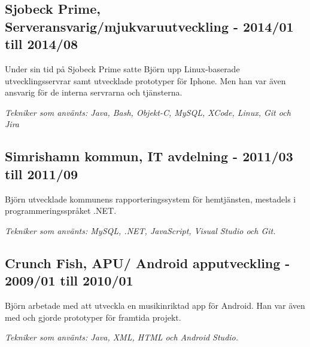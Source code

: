 \documentclass{article}
\begin{document}
\begin{minipage}[t]{0.7\textwidth}
  \vspace{15pt} %
  \subsection*{\textcolor{colorTitelErfarenhet}{Sjobeck Prime, Serveransvarig/mjukvaruutveckling - 2014/01 till 2014/08}}
  Under sin tid på Sjobeck Prime satte Björn upp Linux-baserade utvecklingsservrar samt utvecklade 
  prototyper för Iphone. Men han var även ansvarig för de interna servrarna och tjänsterna.
  
  \vspace{5pt}\textit{Tekniker som använts: Java, Bash, Objekt-C, MySQL, XCode, Linux, Git och Jira} 
    

  \vspace{15pt} %
  \subsection*{\textcolor{colorTitelErfarenhet}{Simrishamn kommun, IT avdelning - 2011/03 till 2011/09}}
  Björn utvecklade kommunens rapporteringssystem för hemtjänsten, mestadels i programmeringsspråket .NET.
  
  \vspace{5pt}\textit{Tekniker som använts: MySQL, .NET, JavaScript, Visual Studio och Git.}
    

  \vspace{15pt} %
  \subsection*{\textcolor{colorTitelErfarenhet}{Crunch Fish, APU/ Android apputveckling - 2009/01 till 2010/01}}
  Björn arbetade med att utveckla en musikinriktad app för Android. Han var även med och gjorde prototyper för framtida projekt.
  
  \vspace{5pt}\textit{Tekniker som använts: Java, XML, HTML och Android Studio.}

\end{minipage}%
\vspace{40pt} %
\end{document}
